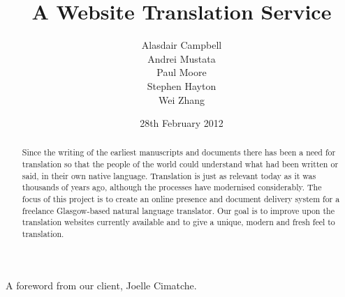 \documentclass{l3proj}
\begin{document}
\title{A Website Translation Service}
\author{Alasdair Campbell \\
	Andrei Mustata \\
	Paul Moore \\
        Stephen Hayton \\
	Wei Zhang}
\date{28th February 2012}


\maketitle
\begin{abstract}

Since the writing of the earliest manuscripts and documents there has been a
need for translation so that the people of the world could understand what had
been written or said, in their own native language. Translation is just as
relevant today as it was thousands of years ago, although the processes have
modernised considerably. The focus of this project is to create an online
presence and document delivery system for a freelance Glasgow-based natural
language translator. Our goal is to improve upon the translation websites
currently available and to give a unique, modern and fresh feel to translation.

\end{abstract}
\educationalconsent
\tableofcontents
\newpage
\begin{flushleft}
A foreword from our client, Joelle Cimatche.
\end{flushleft}	
\end{document}
